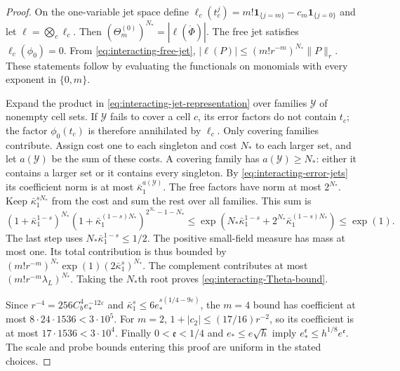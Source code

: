 \begin{proof}
On the one-variable jet space define
$\ell_c(t_c^j)=m!\mathbf1_{\{j=m\}}-c_m\mathbf1_{\{j=0\}}$
and let $\ell=\bigotimes_c\ell_c$.
Then $(\Theta_m^{(0)})^{N_*}=|\ell(\mathring\Phi)|$.
The free jet satisfies $\ell_c(\phi_0)=0$.
From \eqref{eq:interacting-free-jet},
$|\ell(P)|\le(m!r^{-m})^{N_*}\|P\|_r$.
These statements follow by evaluating the
functionals on monomials with every exponent
in $\{0,m\}$.

Expand the product in
\eqref{eq:interacting-jet-representation} over
families $\mathcal Y$ of nonempty cell sets.
If $\mathcal Y$ fails to cover a cell $c$,
its error factors do not contain $t_c$;
the factor $\phi_0(t_c)$ is therefore
annihilated by $\ell_c$. Only covering
families contribute.
Assign cost one to each singleton and
cost $N_*$ to each larger set, and let
$a(\mathcal Y)$ be the sum of these costs.
A covering family has $a(\mathcal Y)\ge N_*$:
either it contains a larger set or it
contains every singleton.
By \eqref{eq:interacting-error-jets} its
coefficient norm is at most
$\bar\kappa_1^{a(\mathcal Y)}$.
The free factors have norm at most $2^{N_*}$.
Keep $\bar\kappa_1^{sN_*}$ from the cost
and sum the rest over all families. This
sum is
\[
 (1+\bar\kappa_1^{1-s})^{N_*}
  (1+\bar\kappa_1^{(1-s)N_*})^{2^{N_*}-1-N_*}
 \le\exp\left(N_*\bar\kappa_1^{1-s}
                  +2^{N_*}\bar\kappa_1^{(1-s)N_*}\right)
 \le\exp(1).
\]
The last step uses $N_*\bar\kappa_1^{1-s}\le1/2$.
The positive small-field measure has mass at
most one. Its total contribution is thus
bounded by
$(m!r^{-m})^{N_*}\exp(1)(2\bar\kappa_1^s)^{N_*}$.
The complement contributes at most
$(m!r^{-m}\lambda_L)^{N_*}$.
Taking the $N_*$th root proves
\eqref{eq:interacting-Theta-bound}.

Since $r^{-4}=256C_b^4e_*^{-12\varepsilon}$
and $\bar\kappa_1^s\le6e_*^{s(1/4-9\varepsilon)}$,
the $m=4$ bound has coefficient at most
$8\cdot24\cdot1536<3\cdot10^5$.
For $m=2$, $1+|c_2|\le(17/16)r^{-2}$,
so its coefficient is at most
$17\cdot1536<3\cdot10^4$.
Finally $0<\mathfrak e<1/4$ and
$e_*\le e\sqrt h$ imply
$e_*^{\mathfrak e}\le h^{1/8}e^{\mathfrak e}$.
The scale and probe bounds entering this
proof are uniform in the stated choices.
\end{proof}

